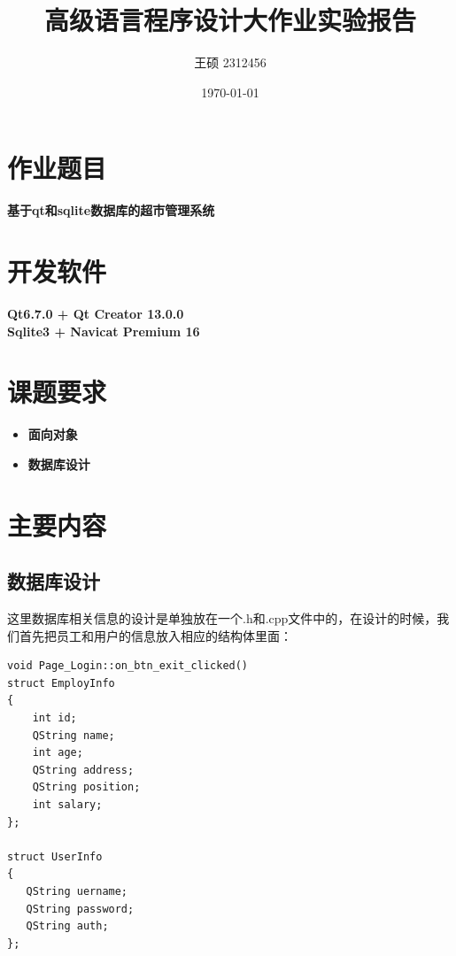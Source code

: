 \documentclass{article}
\title{高级语言程序设计大作业实验报告}
\author{王硕 2312456 }
\date{\today}
\begin{document}
\maketitle
\tableofcontents


\section{作业题目}
\textbf{基于qt和sqlite数据库的超市管理系统}




\section{开发软件}
\textbf{Qt6.7.0 + Qt Creator 13.0.0}
\\
\indent
\textbf{Sqlite3 + Navicat Premium 16}


\section{课题要求}
\begin{itemize}[noitemsep, leftmargin=*]
\item \textbf{面向对象}
\item \textbf{数据库设计}
\end{itemize}


\section{主要内容}
\subsection{数据库设计}
这里数据库相关信息的设计是单独放在一个.h和.cpp文件中的，在设计的时候，我们首先把员工和用户的信息放入相应的结构体里面：
\begin{lstlisting}[style=qtstyle, caption={Qt代码示例}, label=qt_example]
    void Page_Login::on_btn_exit_clicked()
struct EmployInfo
{
    int id;
    QString name;
    int age;
    QString address;
    QString position;
    int salary;
};

struct UserInfo
{
   QString uername;
   QString password;
   QString auth;
};
\end{lstlisting}
\end{document}

